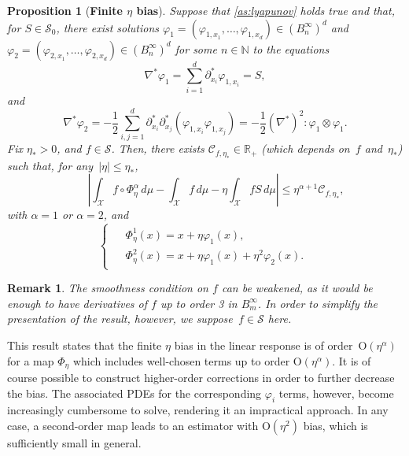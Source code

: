\documentclass[11pt]{article}
\newcommand{\R}{\mathbb{R}}
\newcommand{\N}{\mathbb{N}}
\renewcommand{\S}{\mathscr{S}}
\newcommand{\bigO}{\mathrm{O}}
\renewcommand{\leq}{\leqslant}
\newtheorem{remark}{Remark}
\newtheorem{proposition}{Proposition}
\theoremstyle{definition}
\begin{document}
\begin{proposition}[{\bf Finite $\eta$ bias}]
\label{prop:gen_subtraction}
Suppose that \cref{as:lyapunov} holds true and that, for $S\in\S_0$, there exist solutions $\varphi_1 = (\varphi_{1,x_1},\dotsc,\varphi_{1,x_d}) \in (B^\infty_n)^d$ and $\varphi_2=(\varphi_{2,x_1},\dotsc,\varphi_{2,x_d}) \in (B^\infty_n)^d$ for some $n\in\N$ to the equations
\begin{equation}
	\nabla^*\varphi_1 = \sum_{i=1}^d \partial_{x_i}^* \varphi_{1,x_i} = S, \label{eq:varphi1_PDE}
\end{equation}
and
\begin{equation}
	\nabla^*\varphi_2 = -\frac{1}{2}\sum_{i,j=1}^d \partial_{x_i}^*\partial_{x_j}^* (\varphi_{1,x_i}\varphi_{1,x_j}) = -\frac{1}{2}(\nabla^*)^2 \colon \varphi_1\otimes \varphi_1.
	\label{eq:varphi2_PDE}
\end{equation}
Fix $\eta_*>0$, and $f\in \S$. Then, there exists $\mathcal{C}_{f,\eta_*} \in\R_+$ (which depends on~$f$ and~$\eta_*$) such that, for any~$|\eta| \leq \eta_*$,
\begin{equation}
	\qquad \left|\int_\mathcal{X} f\circ\Phi^\alpha_\eta \, d\mu - \int_\mathcal{X} f \, d\mu - \eta\int_\mathcal{X} f S \, d\mu\right| \leq \eta^{\alpha+1} \mathcal{C}_{f,\eta_*},
	\label{eq:prop_eta_bias_bound}
\end{equation}
with $\alpha=1$ or $\alpha=2$, and
\begin{equation}
\begin{cases}
\begin{aligned}
	&\Phi_\eta^1(x) = x + \eta\varphi_1(x), \\
	&\Phi_\eta^2(x) = x + \eta\varphi_1(x) + \eta^2\varphi_2(x).
\end{aligned}
\end{cases}
\label{eq:Phi_alpha}
\end{equation}
\end{proposition}

\begin{remark}
The smoothness condition on $f$ can be weakened, as it would be enough to have derivatives of $f$ up to order 3 in $B^\infty_m$. In order to simplify the presentation of the result, however, we suppose~$f\in \S$ here.
\end{remark}

This result states that the finite $\eta$ bias in the linear response is of order~$\bigO(\eta^{\alpha})$ for a map $\Phi_\eta$ which includes well-chosen terms up to order $\bigO(\eta^\alpha)$. It is of course possible to construct higher-order corrections in order to further decrease the bias. The associated PDEs for the corresponding $\varphi_i$ terms, however, become increasingly cumbersome to solve, rendering it an impractical approach. In any case, a second-order map leads to an estimator with $\bigO(\eta^2)$ bias, which is sufficiently small in general.
\end{document}
